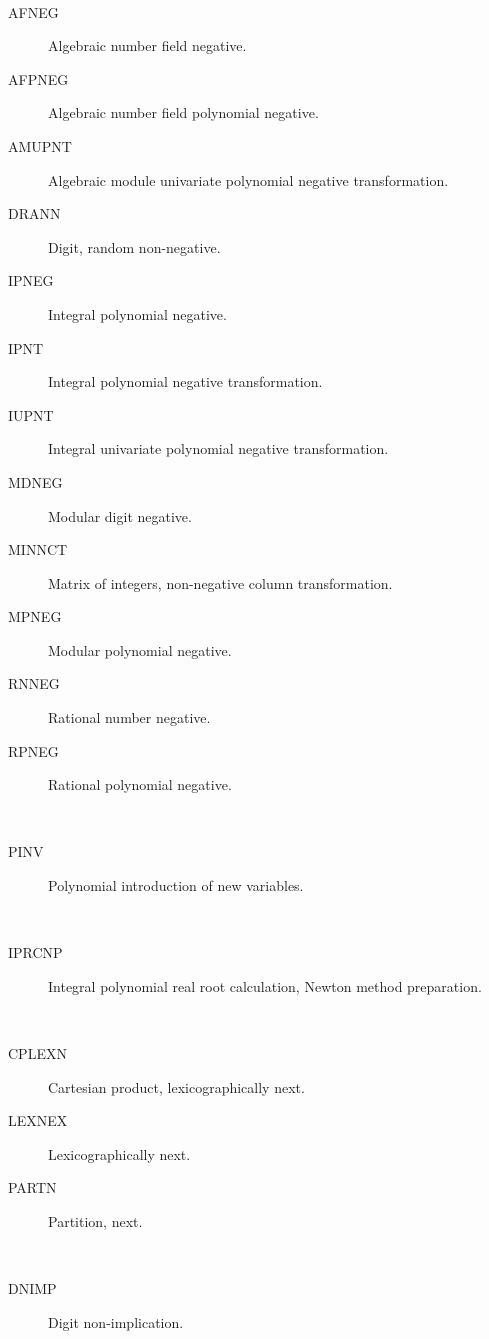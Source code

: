 \begin{description}
\begin{description}
  \end{description}
\item[negative] \ \ 
  \begin{description}
  \item[AFNEG]  Algebraic number field negative.
  \item[AFPNEG]  Algebraic number field polynomial negative.
  \item[AMUPNT]  Algebraic module univariate polynomial negative
    transformation.
  \item[DRANN]  Digit, random non-negative.
  \item[IPNEG]  Integral polynomial negative.
  \item[IPNT]  Integral polynomial negative transformation.
  \item[IUPNT]  Integral univariate polynomial negative transformation.
  \item[MDNEG]  Modular digit negative.
  \item[MINNCT]  Matrix of integers, non-negative column transformation.
  \item[MPNEG]  Modular polynomial negative.
  \item[RNNEG]  Rational number negative.
  \item[RPNEG]  Rational polynomial negative.
  \end{description}
\item[new] \ \ 
  \begin{description}
  \item[PINV]  Polynomial introduction of new variables.
  \end{description}
\item[newton] \ \ 
  \begin{description}
  \item[IPRCNP]  Integral polynomial real root calculation, Newton method
    preparation.
  \end{description}
\item[next] \ \ 
  \begin{description}
  \item[CPLEXN]  Cartesian product, lexicographically next.
  \item[LEXNEX]  Lexicographically next.
  \item[PARTN]  Partition, next.
  \end{description}
\item[non] \ \ 
  \begin{description}
  \item[DNIMP]  Digit non-implication.

\end{description}
\end{description}
